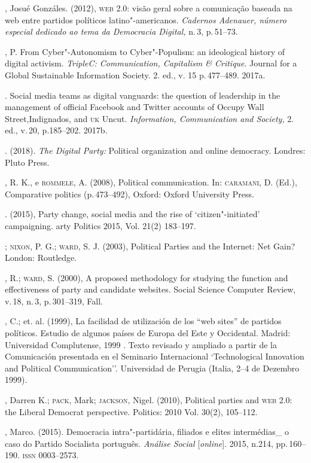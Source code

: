 \begin{bibliohedra}
, Josué Gonzáles. (2012), \textsc{web 2.0}: visão geral sobre a
comunicação baseada na web entre partidos políticos latino"-americanos.
\textit{Cadernos Adenauer, número especial dedicado ao tema da Democracia
Digital,} n.\,3, p.\,51--73.

, P. From Cyber"-Autonomism to Cyber"-Populism: an ideological
history of digital activism. \textit{TripleC: Communication, Capitalism \&
Critique}. Journal for a Global Sustainable Information Society. 2. ed.,
v. 15 p.\,477--489. 2017a.

\titidem. Social media teams as digital vanguards: the question of
leadership in the management of official Facebook and Twitter accounts
of Occupy Wall Street,Indignados, and \textsc{uk} Uncut. \textit{Information,
Communication and Society,} 2. ed., v.\,20, p.185--202. 2017b.

\titidem. (2018). \textit{The Digital Party:} Political organization
and online democracy. Londres: Pluto Press.

, R. K., e \textsc{rommele}, A. (2008), Political communication. In:
\textsc{caramani}, D. (Ed.), Comparative politics (p.\,473--492), Oxford: Oxford
University Press.

\titidem. (2015), Party change, social media and the rise of
`citizen"-initiated' campaigning. arty Politics 2015, Vol. 21(2)
183--197.

\titidem; \textsc{nixon}, P. G.; \textsc{ward}, S. J. (2003), Political Parties and the Internet: Net Gain? London: Routledge.

, R.; \textsc{ward}, S. (2000), A proposed methodology for studying the
function and effectiveness of party and candidate websites. Social
Science Computer Review, v.\,18, n.\,3, p.\,301--319, Fall.

, C.; et. al. (1999), La facilidad de utilización de los ``web
sites'' de partidos políticos. Estudio de algunos países de Europa del
Este y Occidental. Madrid: Universidad Complutense, 1999 . Texto
revisado y ampliado a partir de la Comunicación presentada en el
Seminario Internacional `Technological Innovation and Political
Communication''. Universidad de Perugia (Italia, 2--4 de Dezembro 1999).

, Darren K.; \textsc{pack}, Mark; \textsc{jackson}, Nigel. (2010), Political
parties and \textsc{web 2.0}: the Liberal Democrat perspective. Politics: 2010
Vol. 30(2), 105--112.

, Marco. (2015). Democracia intra"-partidária, filiados e elites
intermédias\_ o caso do Partido Socialista português. \textit{Análise
Social} {[}\textit{online}{]}. 2015, n.214, pp.\,160--190. \textsc{issn} 0003--2573.


\end{bibliohedra}
